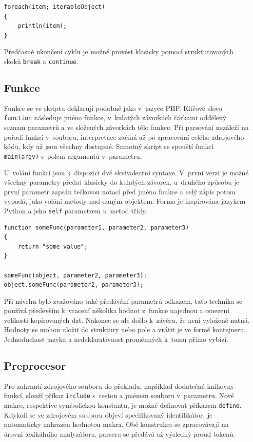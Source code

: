 \documentclass[11pt,twoside,a4paper]{book}
\begin{document}
\begin{verbatim}
foreach(item; iterableObject)
{
    println(item);
}
\end{verbatim}

Předčasné ukončení cyklu je možné provést klasicky pomocí strukturovaných skoků \texttt{break} a \texttt{continue}.


\subsection{Funkce}

Funkce se ve skriptu deklarují podobně jako v~jazyce PHP. Klíčové slovo \texttt{function} následuje jméno funkce, v~kulatých závorkách čárkami oddělený seznam parametrů a ve složených závorkách tělo funkce. Při parsování nezáleží na pořadí funkcí v~souboru, interpretace začíná až po zpracování celého zdrojového kódu, kdy už jsou všechny dostupné. Samotný skript se spouští funkcí \texttt{main(argv)} s~polem argumentů v~parametru.

U~volání funkcí jsou k~dispozici dvě ekvivalentní syntaxe. V~první verzi je možné všechny parametry předat klasicky do kulatých závorek, u~druhého způsobu je první parametr zapsán tečkovou notací před jméno funkce a celý zápis potom vypadá, jako volání metody nad daným objektem. Forma je inspirována jazykem Python a jeho \texttt{self} parametrem u~metod třídy.

\begin{verbatim}
function someFunc(parameter1, parameter2, parameter3)
{
    return "some value";
}

someFunc(object, parameter2, parameter3);
object.someFunc(parameter2, parameter3);
\end{verbatim}

Při návrhu bylo zvažováno také předávání parametrů odkazem, tato technika se používá především k~vracení několika hodnot z~funkce najednou a omezení velikosti kopírovaných dat. Nakonec se ale došlo k~závěru, že není vyloženě nutná. Hodnoty se mohou uložit do struktury nebo pole a vrátit je ve formě kontejneru. Jednoduchost jazyka a nedeklarativnost proměnných k~tomu přímo vybízí.


\subsection{Preprocesor}
\label{preprocesor}

Pro zahrnutí zdrojového souboru do překladu, například dodatečné knihovny funkcí, slouží příkaz \texttt{include} s~cestou a jménem souboru v~parametru. Nové makro, respektive symbolickou konstantu, je možné definovat příkazem \texttt{define}. Kdykoli se ve zdrojovém souboru objeví specifikovaný identifikátor, je automaticky nahrazen hodnotou makra. Obě konstrukce se zpracovávají na úrovni lexikálního analyzátoru, parseru se předává až výsledný proud tokenů.
\end{document}
